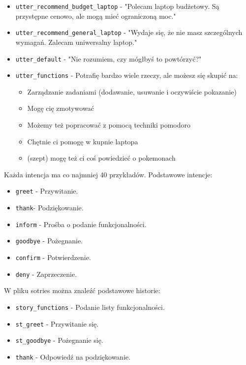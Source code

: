 \documentclass{article}
\begin{document}
\begin{itemize}
  \item[\textcolor{violet}{\textbullet}] \verb|utter_recommend_budget_laptop| - "Polecam laptop budżetowy. Są przystępne cenowo, ale mogą mieć ograniczoną moc."
  \item[\textcolor{violet}{\textbullet}] \verb|utter_recommend_general_laptop| - "Wydaje się, że nie masz szczególnych wymagań. Zalecam uniwersalny laptop."
  \item[\textcolor{violet}{\textbullet}] \verb|utter_default| - "Nie rozumiem, czy mógłbyś to powtórzyć?"
  \item[\textcolor{violet}{\textbullet}] \verb|utter_functions| - Potrafię bardzo wiele rzeczy, ale możesz się skupić na:
    \begin{itemize}
      \item Zarządzanie zadaniami (dodawanie, usuwanie i oczywiście pokazanie)
      \item Mogę cię zmotywować
      \item Możemy też popracować z pomocą techniki pomodoro
      \item Chętnie ci pomogę w kupnie laptopa
      \item (szept) mogę też ci coś powiedzieć o pokemonach
    \end{itemize}
\end{itemize}
Każda intencja ma co najmniej 40 przykładów. Podstawowe intencje:
\begin{itemize}
    \item[\textcolor{violet}{\textbullet}] \verb|greet| - Przywitanie.
    \item[\textcolor{violet}{\textbullet}] \verb|thank|- Podziękowanie.
    \item[\textcolor{violet}{\textbullet}] \verb|inform| - Prośba o podanie funkcjonalności.
    \item[\textcolor{violet}{\textbullet}] \verb|goodbye| - Pożegnanie.
    \item[\textcolor{violet}{\textbullet}] \verb|confirm| - Potwierdzenie.
    \item[\textcolor{violet}{\textbullet}] \verb|deny| - Zaprzeczenie.
\end{itemize}
W pliku sotries można znaleźć podstawowe historie:
\begin{itemize}
    \item[\textcolor{violet}{\textbullet}] \verb|story_functions| - Podanie listy funkcjonalności.
    \item[\textcolor{violet}{\textbullet}] \verb|st_greet| - Przywitanie się.
    \item[\textcolor{violet}{\textbullet}] \verb|st_goodbye| - Pożegnanie się.
    \item[\textcolor{violet}{\textbullet}] \verb|thank| - Odpowiedź na podziękowanie.
\end{itemize}
\end{document}
